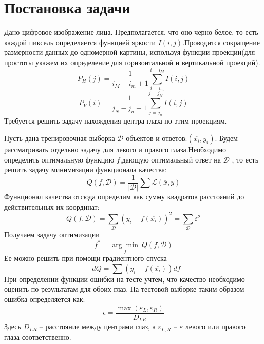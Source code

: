 \documentclass[12pt,a4paper,notitlepage]{article}
\begin{document}
\section{Постановка задачи}
Дано цифровое изображение лица. Предполагается, что оно черно-белое, то есть каждой пиксель определяется функцией яркости $I(i,j)$.Проводится сокращение размерности данных до одномерной картины, используя функции проекции(для простоты укажем их определение для горизонтальной и вертикальной проекций).	
$$P_H(j) =\frac{1}{i_M -i_m +1} \sum_{i=i_m}^{i=i_M} I(i,j) $$
$$P_V(i) =\frac{1}{j_N -j_n +1} \sum_{j=j_n}^{j=j_N} I(i,j) $$
Требуется решить задачу нахождения центра глаза по этим проекциям.
\par Пусть дана тренировочная выборка $\mathcal{D}$ объектов и ответов:$(\overline{x_i},y_i)$. Будем рассматривать отдельно задачу для левого и правого глаза.Необходимо определить оптимальную функцию $f$,дающую оптимальный ответ на $\mathcal{D}$ , то есть решить задачу минимизации функционала качества:
$$Q(f,\mathcal{D}) = \frac{1}{|\mathcal{D}|}\sum \mathcal{L}(\overline{x},y)$$
Функционал качества отсюда определим как сумму квадратов расстояний до действительных их координат:
$$Q(f,\mathcal{D}) = \sum_{\mathcal{D}}(y_i - f(\overline{x_i}))^2 = \sum_{\mathcal{D}}\varepsilon^2$$
Получаем задачу оптимизации
$$f^* =  \underset{f}{\arg \min} ~Q(f,\mathcal{D})$$	
Ее можно решить при помощи градиентного спуска
$$ -dQ = \sum(y_i - f(\overline{x_i}))df $$
При определении функции ошибки на тесте учтем, что качество необходимо оценить по результатам для обоих глаз. На тестовой выборке таким образом ошибка определяется как:
$$\epsilon = \frac{\max (\varepsilon_L,\varepsilon_R)}{D_{LR}}$$
Здесь $D_{LR}$ -- расстояние между центрами глаз, а $\varepsilon_{L,R}$ -- $\varepsilon$ левого или правого глаза соответственно.
 


 
\end{document}

